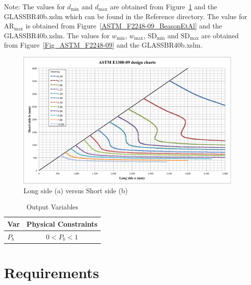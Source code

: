 \documentclass[12pt]{article}
\begin{document}
Note: The values for $d_\text{min}$ and $d_\text{max}$ are obtained from Figure~\ref{Fig_ASTM_E1300-09}
and the GLASS\textunderscore BR\textunderscore 40b.xslm which can be found in the 
Reference directory. The value for $\mbox{AR}_\text{max}$ is obtained from Figure~\ref{ASTM_F2248-09_BeasonEtAl}
and the GLASS\textunderscore BR\textunderscore 40b.xslm.
The values for $w_\text{min}$, $w_\text{max}$, $\text{SD}_\text{min}$ and $\text{SD}_\text{max}$
are obtained from Figure~\ref{Fig_ASTM_F2248-09} and the GLASS\textunderscore BR\textunderscore 40b.xslm. 
\newline

\begin{figure}[h!]
  \begin{center}
    \includegraphics[width=\textwidth]{ASTM_E1300-09_design_charts.png}
    \caption{Long side (a) versus Short side (b)}
    \label{Fig_ASTM_E1300-09}
  \end{center}
\end{figure}

\begin{table}[!h]
\caption{Output Variables} \label{TblOutputVar}
\renewcommand{\arraystretch}{1.2}
\begin{center}
\begin{tabular}{l c} 
\toprule
\textbf{Var} & \textbf{Physical Constraints} \\
\midrule 
$P_b$ & $0 < P_b < 1$\\
\bottomrule
\end{tabular}
\end{center}
\end{table}
  
\section{Requirements}  
  
\end{document}
